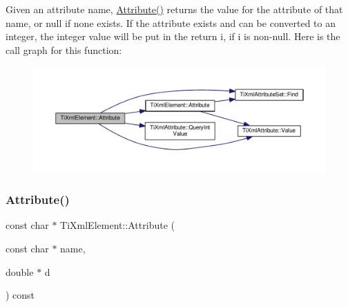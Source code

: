 Given an attribute name, \hyperlink{class_ti_xml_element_a6042f518748f475a7ac4b4e0b509eb05}{Attribute()} returns the value for the attribute of that name, or null if none exists. If the attribute exists and can be converted to an integer, the integer value will be put in the return \textquotesingle{}i\textquotesingle{}, if \textquotesingle{}i\textquotesingle{} is non-\/null. Here is the call graph for this function\+:
\nopagebreak
\begin{figure}[H]
\begin{center}
\leavevmode
\includegraphics[width=350pt]{class_ti_xml_element_a8005d0b808fd02bd1246710cdf95e5f6_cgraph}
\end{center}
\end{figure}
\mbox{\label{class_ti_xml_element_a09df893402d0ab1402c8725e6d30ec04}} 
\subsubsection{\texorpdfstring{Attribute()}{Attribute()}\hspace{0.1cm}{\footnotesize\ttfamily [3/3]}}
{\footnotesize\ttfamily const char $\ast$ Ti\+Xml\+Element\+::\+Attribute (\begin{DoxyParamCaption}\item[{const char $\ast$}]{name,  }\item[{double $\ast$}]{d }\end{DoxyParamCaption}) const}

